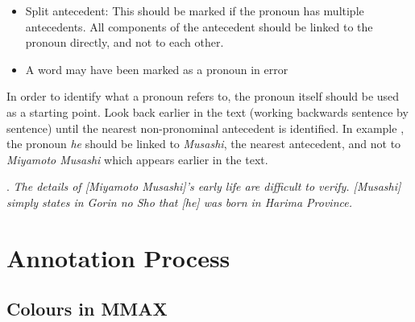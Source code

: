 \documentclass[a4paper]{article}
\begin{document}
{{\begin{itemize}
\item Split antecedent: This should be marked if the pronoun has multiple antecedents. All components
of the antecedent should be linked to the pronoun directly, and not to each other.

\item A word may have been marked as a pronoun in error 
\end{itemize}

In order to identify what a pronoun refers to, the pronoun itself should be used as a starting point. Look back earlier in the text (working backwards sentence by sentence) until the nearest non-pronominal antecedent is identified. In example \Next, the pronoun {\sl he} should be linked to {\sl Musashi}, the nearest antecedent, and not
to {\sl Miyamoto Musashi} which appears earlier in the text.

\ex.
{\sl The details of [Miyamoto Musashi]'s early life are difficult to verify. [Musashi] simply states in Gorin no Sho that [he] was born in Harima Province.}



\section{Annotation Process}

\subsection{Colours in MMAX}

}}
\end{document}
